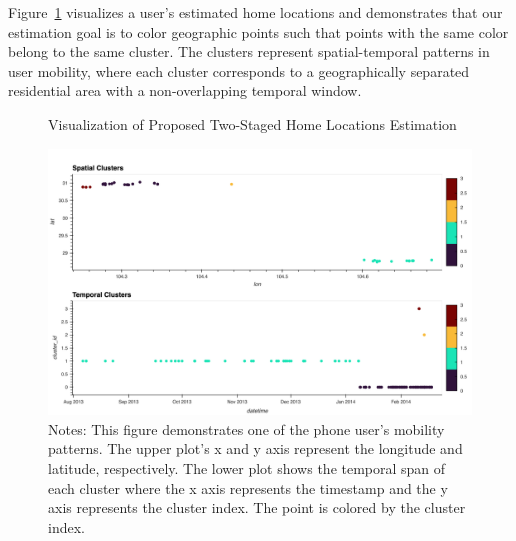 Figure~\ref{fig:cluster} visualizes a user's estimated home locations and demonstrates that our estimation goal is to color geographic points such that points with the same color belong to the same cluster.
The clusters represent spatial-temporal patterns in user mobility, where each cluster corresponds to a geographically separated residential area with a non-overlapping temporal window.


\begin{figure}[h!]
\vspace{0.3cm}
\centering
\caption{Visualization of Proposed Two-Staged Home Locations Estimation}

\includegraphics[scale=0.17]{figures/cluster_res.png}

\vspace{0.1cm}
\caption*{Notes:  This figure demonstrates one of the phone user's mobility patterns. The upper plot's x and y axis represent the longitude and latitude, respectively. The lower plot shows the temporal span of each cluster where the x axis represents the timestamp and the y axis represents the cluster index. The point is colored by the cluster index.}
\label{fig:cluster}
\end{figure}


\clearpage\newpage

